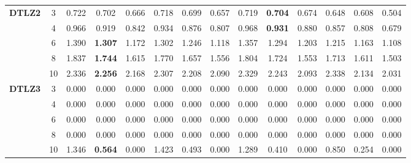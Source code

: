 \documentclass[onecolumn,10pt]{asme2ej}
\begin{document}
\begin{table}[!htb]
\begin{tabular}{|c|c|c|c|c|c|c|c|c|c|c|c|c|c|}
	\multirow{5}{*}{\textbf{DTLZ2}} & 3          & 0.722         & 0.702          & 0.666          & 0.718         & 0.699          & 0.657          & 0.719         & \textbf{0.704} & 0.674          & 0.648         & 0.608          & 0.504          \\ \cline{2-14} 
	& 4          & 0.966         & 0.919          & 0.842          & 0.934         & 0.876          & 0.807          & 0.968         & \textbf{0.931} & 0.880          & 0.857         & 0.808          & 0.679          \\ \cline{2-14} 
	& 6          & 1.390         & \textbf{1.307} & 1.172          & 1.302         & 1.246          & 1.118          & 1.357         & 1.294          & 1.203          & 1.215         & 1.163          & 1.108          \\ \cline{2-14} 
	& 8          & 1.837         & \textbf{1.744} & 1.615          & 1.770         & 1.657          & 1.556          & 1.804         & 1.724          & 1.553          & 1.713         & 1.611          & 1.503          \\ \cline{2-14} 
	& 10         & 2.336         & \textbf{2.256} & 2.168          & 2.307         & 2.208          & 2.090          & 2.329         & 2.243          & 2.093          & 2.338         & 2.134          & 2.031          \\ \hline
	\multirow{5}{*}{\textbf{DTLZ3}} & 3          & 0.000         & 0.000          & 0.000          & 0.000         & 0.000          & 0.000          & 0.000         & 0.000          & 0.000          & 0.000         & 0.000          & 0.000          \\ \cline{2-14} 
	& 4          & 0.000         & 0.000          & 0.000          & 0.000         & 0.000          & 0.000          & 0.000         & 0.000          & 0.000          & 0.000         & 0.000          & 0.000          \\ \cline{2-14} 
	& 6          & 0.000         & 0.000          & 0.000          & 0.000         & 0.000          & 0.000          & 0.000         & 0.000          & 0.000          & 0.000         & 0.000          & 0.000          \\ \cline{2-14} 
	& 8          & 0.000         & 0.000          & 0.000          & 0.000         & 0.000          & 0.000          & 0.000         & 0.000          & 0.000          & 0.000         & 0.000          & 0.000          \\ \cline{2-14} 
	& 10         & 1.346         & \textbf{0.564} & 0.000          & 1.423         & 0.493          & 0.000          & 1.289         & 0.410          & 0.000          & 0.850         & 0.254          & 0.000          \\ \hline

\end{tabular}
\end{table}
\end{document}

